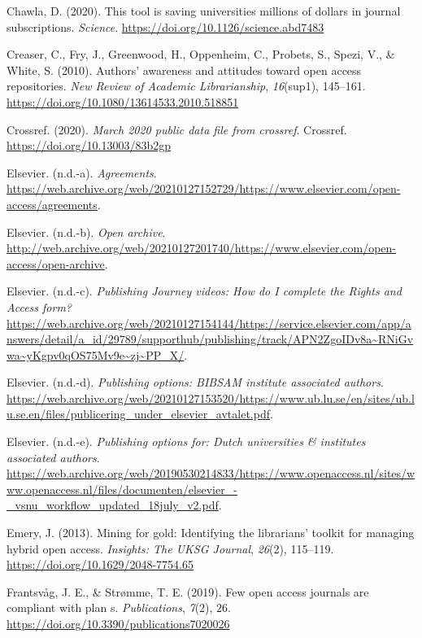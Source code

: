 \documentclass[a4paper,man,floatsintext,longtable,noextraspace,12pt]{apa6}
\newlength{\cslhangindent}
\newenvironment{cslreferences}%
  {\setlength{\parindent}{0pt}%
  \everypar{\setlength{\hangindent}{\cslhangindent}}\ignorespaces}%
  {\par}
\begin{document}
\begin{cslreferences}
\leavevmode\hypertarget{ref-Chawla_2020}{}%
Chawla, D. (2020). This tool is saving universities millions of dollars
in journal subscriptions. \emph{Science}.
\url{https://doi.org/10.1126/science.abd7483}

\leavevmode\hypertarget{ref-Creaser_2010}{}%
Creaser, C., Fry, J., Greenwood, H., Oppenheim, C., Probets, S., Spezi,
V., \& White, S. (2010). Authors' awareness and attitudes toward open
access repositories. \emph{New Review of Academic Librarianship},
\emph{16}(sup1), 145--161.
\url{https://doi.org/10.1080/13614533.2010.518851}

\leavevmode\hypertarget{ref-Crossref_2020}{}%
Crossref. (2020). \emph{March 2020 public data file from crossref}.
Crossref. \url{https://doi.org/10.13003/83b2gp}

\leavevmode\hypertarget{ref-Els_Agreements}{}%
Elsevier. (n.d.-a). \emph{Agreements}.
\url{https://web.archive.org/web/20210127152729/https://www.elsevier.com/open-access/agreements}.

\leavevmode\hypertarget{ref-Els_Archive}{}%
Elsevier. (n.d.-b). \emph{Open archive}.
\url{http://web.archive.org/web/20210127201740/https://www.elsevier.com/open-access/open-archive}.

\leavevmode\hypertarget{ref-Els_videos}{}%
Elsevier. (n.d.-c). \emph{Publishing Journey videos: How do I complete
the Rights and Access form?}
\url{https://web.archive.org/web/20210127154144/https://service.elsevier.com/app/answers/detail/a_id/29789/supporthub/publishing/track/APN2ZgoIDv8a~RNiGvwa~yKgpv0qOS75Mv9e~zj~PP_X/}.

\leavevmode\hypertarget{ref-lund}{}%
Elsevier. (n.d.-d). \emph{Publishing options: BIBSAM institute
associated authors}.
\url{https://web.archive.org/web/20210127153520/https://www.ub.lu.se/en/sites/ub.lu.se.en/files/publicering_under_elsevier_avtalet.pdf}.

\leavevmode\hypertarget{ref-vsnu}{}%
Elsevier. (n.d.-e). \emph{Publishing options for: Dutch universities \&
institutes associated authors}.
\url{https://web.archive.org/web/20190530214833/https://www.openaccess.nl/sites/www.openaccess.nl/files/documenten/elsevier_-_vsnu_workflow_updated_18july_v2.pdf}.

\leavevmode\hypertarget{ref-Emery_2013}{}%
Emery, J. (2013). Mining for gold: Identifying the librarians' toolkit
for managing hybrid open access. \emph{Insights: The UKSG Journal},
\emph{26}(2), 115--119. \url{https://doi.org/10.1629/2048-7754.65}

\leavevmode\hypertarget{ref-Frantsv_g_2019}{}%
Frantsvåg, J. E., \& Strømme, T. E. (2019). Few open access journals are
compliant with plan s. \emph{Publications}, \emph{7}(2), 26.
\url{https://doi.org/10.3390/publications7020026}


\end{cslreferences}
\end{document}
